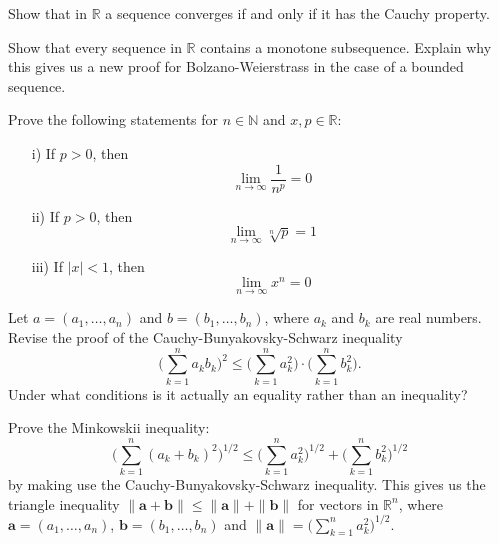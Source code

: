 \documentclass[11pt]{article}%
\begin{document}
\begin{Exercise}[title=**$\dagger$]
	Show that in $\mathbb{R}$ a sequence converges if and only if it has the Cauchy property.
\end{Exercise}

\begin{Exercise}[title=**]
	Show that every sequence in $\mathbb R$ contains a monotone subsequence. Explain why this gives us a new proof for Bolzano-Weierstrass in the case of a bounded sequence.
\end{Exercise}

\begin{Exercise}[title=**]
	Prove the following statements for $n\in \mathbb{N}$ and $x,p\in\mathbb{R}$:
	\begin{enumerate}[label={\alph*)}]
		\item[i)]{If $p>0$, then $$\lim\limits_{n\to\infty}\frac{1}{n^p}=0$$}
		\item[ii)]{If $p>0$, then $$\lim\limits_{n\to\infty}\sqrt[n]{p}=1$$}
		\item[iii)]{If $|x|<1$, then $$\lim\limits_{n\to\infty}x^n=0$$}
	\end{enumerate}
\end{Exercise}

\begin{Exercise}[title=**]
	Let $a=(a_1,\ldots, a_n)$ and $b=(b_1,\ldots, b_n)$, where $a_k$ and $b_k$ are real numbers. Revise the proof of the Cauchy-Bunyakovsky-Schwarz inequality 
	$$
	\Big(\sum_{k=1}^{n}a_kb_k\Big)^2\leq \Big(\sum_{k=1}^{n}a_k^2\Big)\cdot\Big(\sum_{k=1}^{n}b_k^2\Big).
	$$
	Under what conditions is it actually an equality rather than an inequality?
	\bigskip
	
	 Prove the Minkowskii inequality: $$\Big(\sum_{k=1}^{n}(a_k+b_k)^2\Big)^{1/2}\leq\Big(\sum_{k=1}^{n}a_k^2\Big)^{1/2}+\Big(\sum_{k=1}^{n}b_k^2\Big)^{1/2}
	$$ 
	by making use the Cauchy-Bunyakovsky-Schwarz inequality. This gives us the triangle inequality $\|\mathbf a+\mathbf b\|\leq\|\mathbf a\|+\|\mathbf b\|$ for vectors in $\mathbb R^n$, where $\mathbf a=(a_1,\ldots,a_n)$, $\mathbf b=(b_1,\ldots,b_n)$ and $\|\mathbf a\|=\Big(\sum_{k=1}^{n}a_k^2\Big)^{1/2}$.
	\bigskip
\end{Exercise}
\end{document}
